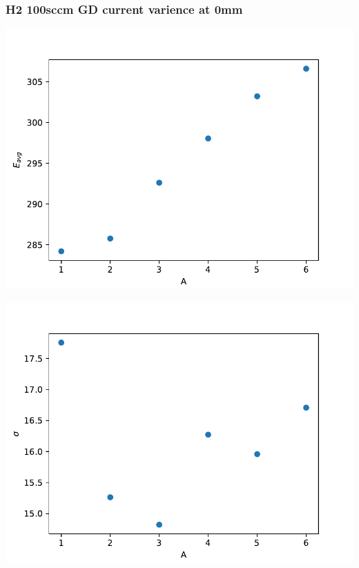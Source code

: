 \documentclass{beamer} %
\begin{document}
\begin{frame}
    \frametitle{H2 100sccm GD current varience at 0mm}
    \begin{minipage}{0.49\textwidth}
        \includegraphics[width=1.1\textwidth]{figures/CurrentVary_H2_100sccm_Energy.pdf}
    \end{minipage}
    \begin{minipage}{0.49\textwidth}
        \includegraphics[width=1.1\textwidth]{figures/CurrentVary_H2_100sccm_Energy_sigma.pdf}
    \end{minipage}
    \begin{minipage}{0.49\textwidth}

\end{minipage}
\end{frame}
\end{document}
